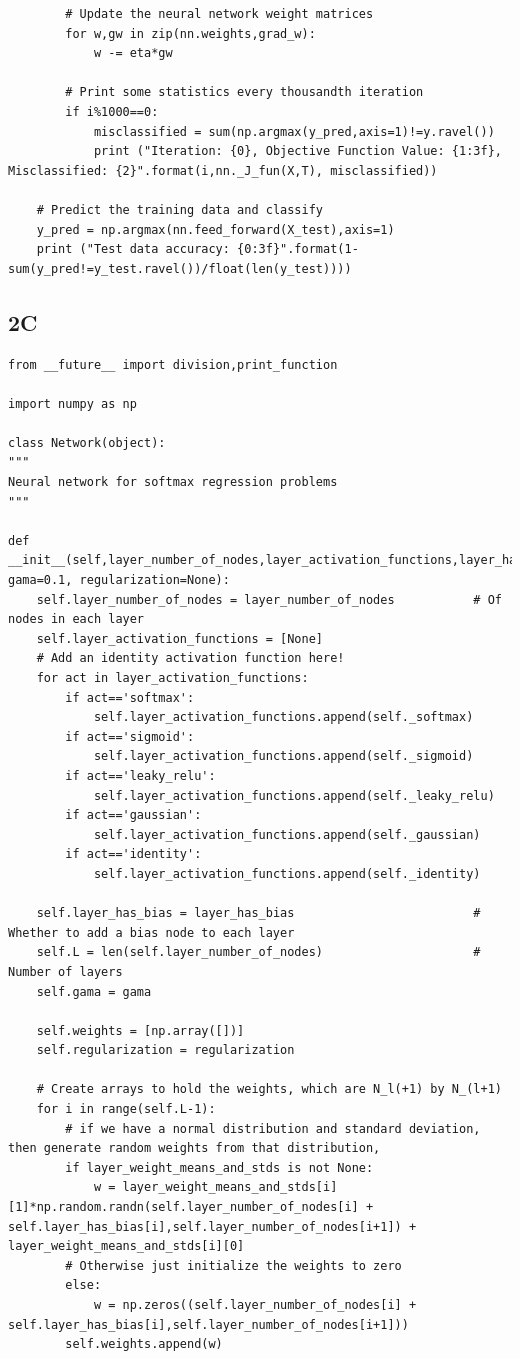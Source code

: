 \documentclass[12pt]{article}
\begin{document}
\begin{flushleft}
\begin{lstlisting}
		# Update the neural network weight matrices
		for w,gw in zip(nn.weights,grad_w):
			w -= eta*gw
		
		# Print some statistics every thousandth iteration
		if i%1000==0:
			misclassified = sum(np.argmax(y_pred,axis=1)!=y.ravel())
			print ("Iteration: {0}, Objective Function Value: {1:3f}, Misclassified: {2}".format(i,nn._J_fun(X,T), misclassified))
	
	# Predict the training data and classify
	y_pred = np.argmax(nn.feed_forward(X_test),axis=1)
	print ("Test data accuracy: {0:3f}".format(1-sum(y_pred!=y_test.ravel())/float(len(y_test))))

		\end{lstlisting}
		
		\subsection*{2C}
		\begin{lstlisting}
from __future__ import division,print_function

import numpy as np

class Network(object):
"""
Neural network for softmax regression problems
"""

def __init__(self,layer_number_of_nodes,layer_activation_functions,layer_has_bias,layer_weight_means_and_stds=None, gama=0.1, regularization=None):
	self.layer_number_of_nodes = layer_number_of_nodes           # Of nodes in each layer
	self.layer_activation_functions = [None]
	# Add an identity activation function here!
	for act in layer_activation_functions:
		if act=='softmax':
			self.layer_activation_functions.append(self._softmax) 
		if act=='sigmoid':
			self.layer_activation_functions.append(self._sigmoid) 
		if act=='leaky_relu':
			self.layer_activation_functions.append(self._leaky_relu) 
		if act=='gaussian':
			self.layer_activation_functions.append(self._gaussian) 
		if act=='identity':
			self.layer_activation_functions.append(self._identity)
	
	self.layer_has_bias = layer_has_bias                         # Whether to add a bias node to each layer
	self.L = len(self.layer_number_of_nodes)                     # Number of layers
	self.gama = gama
	
	self.weights = [np.array([])]
	self.regularization = regularization
	
	# Create arrays to hold the weights, which are N_l(+1) by N_(l+1)
	for i in range(self.L-1):
		# if we have a normal distribution and standard deviation, then generate random weights from that distribution,
		if layer_weight_means_and_stds is not None:
			w = layer_weight_means_and_stds[i][1]*np.random.randn(self.layer_number_of_nodes[i] + self.layer_has_bias[i],self.layer_number_of_nodes[i+1]) + layer_weight_means_and_stds[i][0] 
		# Otherwise just initialize the weights to zero
		else:
			w = np.zeros((self.layer_number_of_nodes[i] + self.layer_has_bias[i],self.layer_number_of_nodes[i+1]))
		self.weights.append(w)


\end{lstlisting}
\end{flushleft}
\end{document}
